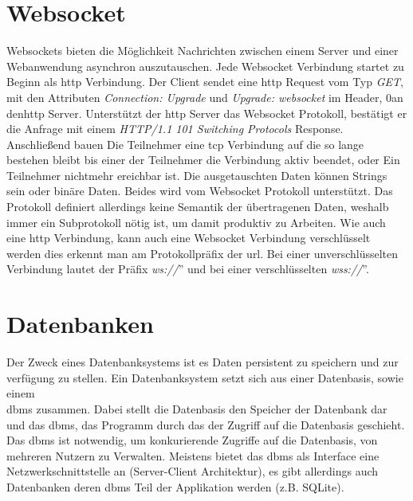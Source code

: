 \section{Websocket}
Websockets bieten die Möglichkeit Nachrichten zwischen einem Server und einer Webanwendung asynchron auszutauschen.
Jede Websocket Verbindung startet zu Beginn als \ac{http} Verbindung. 
Der Client sendet eine \ac{http} Request vom Typ \emph{GET},
mit den Attributen \emph{Connection: Upgrade} und \emph{Upgrade: websocket} im Header, 0an den\ac{http} Server.
Unterstützt der \ac{http} Server das Websocket Protokoll, 
bestätigt er die Anfrage mit einem \emph{HTTP/1.1 101 Switching Protocols} Response.
Anschließend bauen Die Teilnehmer eine \ac{tcp} Verbindung auf die so lange bestehen bleibt bis einer der Teilnehmer die Verbindung aktiv beendet, 
oder Ein Teilnehmer nichtmehr ereichbar ist.
Die ausgetauschten Daten können Strings sein oder binäre Daten. Beides wird vom Websocket Protokoll unterstützt.
Das Protokoll definiert allerdings keine Semantik der übertragenen Daten, 
weshalb immer ein Subprotokoll nötig ist, um damit produktiv zu Arbeiten.
Wie auch eine \ac{http} Verbindung, kann auch eine Websocket Verbindung verschlüsselt werden dies erkennt man am Protokollpräfix der \ac{url}.
Bei einer unverschlüsselten Verbindung lautet der Präfix \glqq{}\emph{ws://}'' und bei einer verschlüsselten \glqq{}\emph{wss://}''.

\section{Datenbanken}
Der Zweck eines Datenbanksystems ist es Daten persistent zu speichern und zur verfügung zu stellen.
Ein Datenbanksystem setzt sich aus einer Datenbasis, sowie einem\\ \ac{dbms} zusammen.
Dabei stellt die Datenbasis den Speicher der Datenbank dar und das \ac{dbms}, 
das Programm durch das der Zugriff auf die Datenbasis geschieht.
Das \ac{dbms} ist notwendig, um konkurierende Zugriffe auf die Datenbasis, von mehreren Nutzern zu Verwalten. \citep{Schubert:2007:3}
Meistens bietet das \ac{dbms} als Interface eine Netzwerkschnittstelle an (Server-Client Architektur), es gibt allerdings auch Datenbanken deren \ac{dbms} Teil der Applikation werden (z.B. SQLite).
